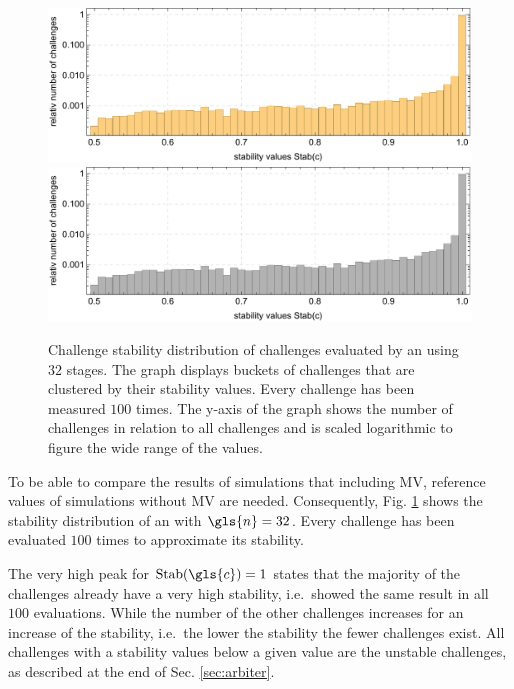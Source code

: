 \begin{figure}[!ht]
\ifx{}\undefined
{}
\else
	\if{}
	\centering
	\includegraphics[width=1.00\textwidth]{images/arbiter-stability-distribution-simulation.pdf}
	\else
	\includegraphics[width=1.00\textwidth]{images/arbiter-stability-distribution-simulation_mono.pdf}
	\fi
\fi
\caption[Challenge stability distribution of an \apuf]{Challenge stability distribution of challenges evaluated by an \apuf using $32$ stages. 
The graph displays buckets of challenges that are clustered by their stability values.
Every challenge has been measured $100$ times. The y-axis of the graph shows the number of challenges in relation to all challenges and is scaled logarithmic to figure the wide range of the values.}  %
\label{fig:arbiterstabilitydistribution}
\end{figure}
\pagebreak

To be able to compare the results of simulations that including \ac{MV}, reference values of \apufs simulations without \ac{MV} are needed.
Consequently, Fig. \ref{fig:arbiterstabilitydistribution} shows the stability distribution of an \apuf with $\gls{n} = 32$.
Every challenge has been evaluated $100$ times to approximate its stability.

The very high peak for $\Stab(\gls{c}) = 1$ states that the majority of the challenges already have a very high stability, i.e.\ showed the same result in all $100$ evaluations.
While the number of the other challenges increases for an increase of the stability, i.e.\ the lower the stability the fewer challenges exist.
All challenges with a stability values below a given value are the unstable challenges, as described at the end of Sec. \ref{sec:arbiter}.

